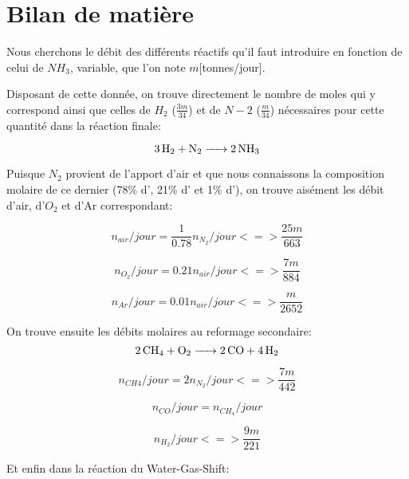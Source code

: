 \documentclass[a4paper, oneside, 12pt]{article}
\begin{document}
\section{Bilan de matière}

Nous cherchons le débit des différents réactifs qu'il faut introduire en fonction de celui de $NH_3$, 
variable, que l'on note $m$[tonnes/jour].

Disposant de cette donnée, on trouve directement le nombre de moles qui y correspond ainsi que 
celles de $H_2$ ($\frac{3m}{34}$) et de $N-2$ ($\frac{m}{34}$) nécessaires  pour cette quantité dans la réaction finale:

\begin{equation*}
	\ce{3H2 + N2 -> 2NH3}
\end{equation*}

Puisque $N_2$ provient de l'apport d'air et que nous connaissons la composition molaire 
de ce dernier (78\% d', 21\% d' et 1\% d'), 
on trouve aisément les débit d'air, d'$O_2$ et d'Ar correspondant:

\begin{equation}
	n_{air}/jour=\frac{1}{0.78} n_{N_2}/jour <=> \frac{25 m}{663}
\end{equation}

\begin{equation}
	n_{O_2}/jour=0.21 n_{air}/jour <=> \frac{7 m}{884}
\end{equation}

\begin{equation}
	n_{Ar}/jour=0.01 n_{air}/jour <=> \frac{m}{2652}
\end{equation}

On trouve ensuite les débits molaires au reformage secondaire:
\begin{equation*}
	\ce{2CH4 + O2 -> 2CO + 4H2}
\end{equation*}

\begin{equation}
	n_{CH4}/jour=2 n_{N_2}/jour <=> \frac{7 m}{442}
\end{equation}

\begin{equation}
	n_{CO}/jour=n_{CH_4}/jour
\end{equation}

\begin{equation}
	n_{H_2}/jour <=> \frac{9m}{221}
\end{equation}

Et enfin dans la réaction du Water-Gas-Shift:
\end{document}
